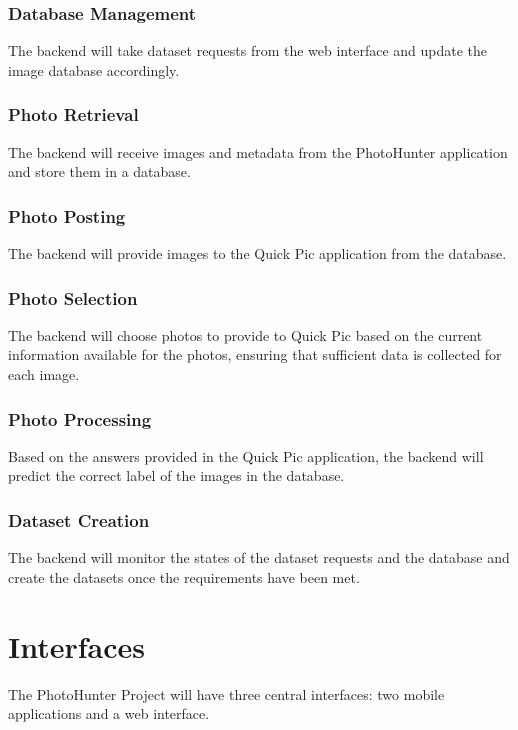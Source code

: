 \documentclass{article}
\begin{document}
        \subsubsection{Database Management}
        The backend will take dataset requests from the web interface and update the
        image database accordingly.

        \subsubsection{Photo Retrieval}
        The backend will receive images and metadata from the PhotoHunter application 
        and store them in a database.

        \subsubsection{Photo Posting}
        The backend will provide images to the Quick Pic application from the database.

        \subsubsection{Photo Selection}
        The backend will choose photos to provide to Quick Pic based on the current 
        information available for the photos, ensuring that sufficient data is collected
        for each image.

        \subsubsection{Photo Processing}
        Based on the answers provided in the Quick Pic application, the backend will 
        predict the correct label of the images in the database.

        \subsubsection{Dataset Creation}
        The backend will monitor the states of the dataset requests and the database 
        and create the datasets once the requirements have been met. 


\section{Interfaces}
The PhotoHunter Project will have three central interfaces: two mobile
applications and a web interface.
\end{document}
